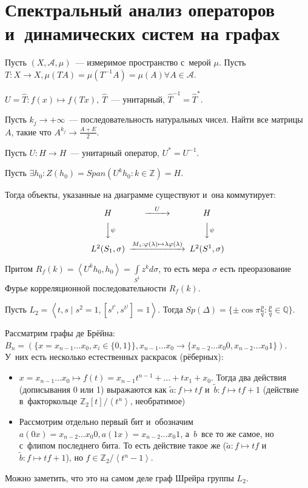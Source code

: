 \documentclass{article}
\begin{document}
\section{Спектральный анализ операторов и~динамических систем на графах}

Пусть $(X, \mathcal{A}, \mu)$~--- измеримое пространство с~мерой $\mu$. Пусть $T: X \rightarrow X,
\mu(TA) = \mu(T^{-1}A) = \mu(A) \forall A \in \mathcal{A}$.

$U = \hat{T}: f(x) \mapsto f(Tx),\ \hat{T}$~--- унитарный, $\hat{T}^{-1} = \hat{T}^\ast$.

\begin{exercise}
	Пусть $k_j \rightarrow +\infty$~--- последовательность натуральных чисел. Найти все матрицы $A$,
	такие что $A^{k_j} \rightarrow \frac{A + E}{2}$.
\end{exercise}

\begin{theorem}
	Пусть $U: H \rightarrow H$~--- унитарный оператор, $U^\ast = U^{-1}$.

	Пусть $\exists h_0: Z(h_0) = Span(U^k h_0: k \in \mathbb{Z}) = H$.

	Тогда объекты, указанные на диаграмме существуют и~она коммутирует:
	$$\begin{CD}
		H           @>U>>  H\\
		@VV\psi V              @VV\psi V\\
		L^2(S_1, \sigma) @> M_z: \phi(\lambda) \mapsto \lambda \phi(\lambda) >> L^2(S^1,\sigma)
	\end{CD}$$

	Притом $R_f(k) = \left< U^k h_0, h_0 \right> = \int\limits_{S^1} z^k d\sigma$, то есть мера
	$\sigma$ есть преоразование Фурье корреляционной последовательности $R_f(k)$.
\end{theorem}

\begin{theorem}
	Пусть $L_2 = \left< t, s \mid s^2 = 1, [s^{t^i}, s^{t^j}] = 1 \right>$. Тогда $Sp(\Delta) = \{\pm
	\cos \pi \frac{p}{q}: \frac{p}{q} \in \mathbb{Q}\}$.
\end{theorem}

Рассматрим графы де Брёйна: $B_n = (\{x = x_{n-1} \ldots x_0, x_i \in \{0, 1\}\},
x_{n-1}\ldots x_0 \rightarrow \{x_{n-2} \ldots x_0 0, x_{n-2} \ldots x_0 1\})$. У~них есть
несколько естественных раскрасок (рёберных):
\begin{itemize}
	\item $x = x_{n-1} \ldots x_0 \mapsto f(t) = x_{n-1} t^{n-1} + \ldots + tx_1 + x_0$. Тогда два
		действия (дописывания 0 или 1) выражаются как $\tilde{a}: f \mapsto tf$ и~$\tilde{b}: f \mapsto
		tf + 1$ (действие в~факторкольце $\mathbb{Z}_2[t] / \left< t^n \right>$, необратимое)
	\item Рассмотрим отдельно первый бит и~обозначим $a(0x) = x_{n-2} \ldots x_0 0, a(1x) = x_{n-2}
		\ldots x_0 1$, а~$b$~все то же самое, но с~флипом последнего бита. То есть действие такое же
		($\tilde{a}: f \mapsto tf$ и~$\tilde{b}: f \mapsto tf + 1$), но
		$f \in \mathbb{Z}_2 / \left< t^n - 1\right>$.
\end{itemize}

Можно заметить, что это на самом деле граф Шрейра группы $L_2$.
\end{document}
